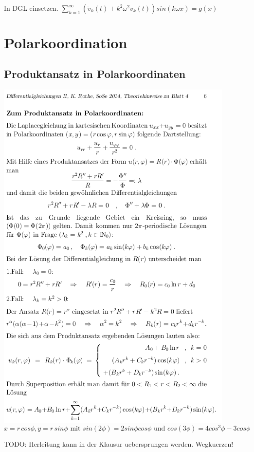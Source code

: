 \documentclass[10pt,a4paper]{article}
\begin{document}
In DGL einsetzen. $\sum\limits_{k=1}^{\infty} \left(\dot{v}_k(t) + k^2 \omega^2 v_k(t) \right) sin(k \omega x) = g(x)$
\pagebreak
\section{Polarkoordination}
\subsection{Produktansatz in Polarkoordinaten}
\includegraphics[scale=0.6]{ununderstandable}
\[
x = r\,cos\phi, y=r\,sin\phi \mbox{ mit } sin(2\phi)=2sin\phi cos\phi \mbox{ und } cos(3\phi)=4cos^3\phi - 3cos \phi
\]

TODO: Herleitung kann in der Klausur uebersprungen werden. Wegkuerzen!
\end{document}
